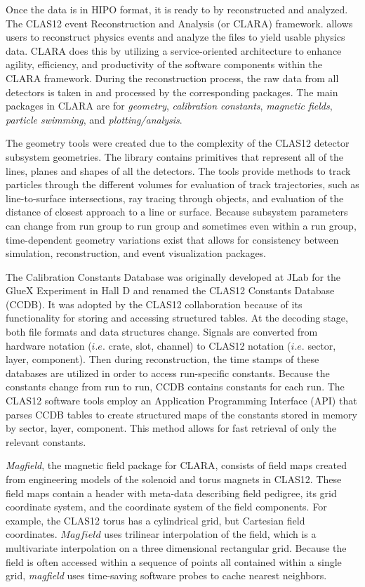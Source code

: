 Once the data is in HIPO format, it is ready to by reconstructed and analyzed. The CLAS12 event Reconstruction and Analysis (or CLARA) framework.\cite{clas12:CLARA} allows users to reconstruct physics events and analyze the files to yield usable physics data. CLARA does this by utilizing a service-oriented architecture to enhance agility, efficiency, and productivity of the software components within the CLARA framework. During the reconstruction process, the raw data from all detectors is taken in and processed by the corresponding packages. The main packages in CLARA are for \textit{geometry}, \textit{calibration constants}, \textit{magnetic fields}, \textit{particle swimming}, and \textit{plotting/analysis}.

The geometry tools were created due to the complexity of the CLAS12 detector subsystem geometries. The library contains primitives that represent all of the lines, planes and shapes of all the detectors. The tools provide methods to track particles through the different volumes for evaluation of track trajectories, such as line-to-surface intersections, ray tracing through objects, and evaluation of the distance of closest approach to a line or surface.  Because subsystem parameters can change from run group to run group and sometimes even within a run group, time-dependent geometry variations exist that allows for consistency between simulation, reconstruction, and event visualization packages.

The Calibration Constants Database was originally developed at JLab for the GlueX Experiment in Hall D and renamed the CLAS12 Constants Database (CCDB). It was adopted by the CLAS12 collaboration because of its functionality for storing and accessing structured tables. At the decoding stage, both file formats and data structures change. Signals are converted from hardware notation ($i.e.$ crate, slot, channel) to CLAS12 notation ($i.e.$ sector, layer, component).\cite{clas12:CLARA} Then during reconstruction, the time stamps of these databases are utilized in order to access run-specific constants. Because the constants change from run to run, CCDB contains constants for each run. The CLAS12 software tools employ an Application Programming Interface (API) that parses CCDB tables to create structured maps of the constants stored in memory by sector, layer, component. This method allows for fast retrieval of only the relevant constants.

\textit{Magfield}, the magnetic field package for CLARA, consists of field maps created from engineering models of the solenoid and torus magnets in CLAS12. These field maps contain a header with meta-data describing field pedigree, its grid coordinate system, and the coordinate system of the field components. For example, the CLAS12 torus has a cylindrical grid, but Cartesian field coordinates. $Magfield$ uses trilinear interpolation of the field, which is a multivariate interpolation on a three dimensional rectangular grid.\cite{clas12:CLARA} Because the field is often accessed within a sequence of points all contained within a single grid, \textit{magfield} uses time-saving software probes to cache nearest neighbors.

